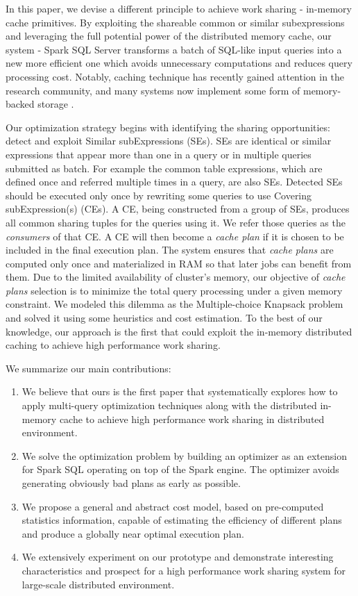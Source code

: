 In this paper, we devise a different principle to achieve work sharing - in-memory cache primitives. By exploiting the shareable common or similar subexpressions and leveraging the full potential power of the distributed memory cache, our system - Spark SQL Server transforms a batch of SQL-like input queries into a new more efficient one which avoids unnecessary computations and reduces query processing cost. Notably, caching technique has recently gained attention in the research community, and many systems now implement some form of memory-backed storage \cite{tachyon, hdfs}.

Our optimization strategy begins with identifying the sharing opportunities: detect and exploit Similar subExpressions (SEs). SEs are identical or similar expressions that appear more than one in a query or in multiple queries submitted as batch. For example the common table expressions, which are defined once and referred multiple times in a query, are also SEs. Detected SEs should be executed only once by rewriting some queries to use Covering subExpression(s) (CEs). A CE, being constructed from a group of SEs, produces all common sharing tuples for the queries using it. We refer those queries as the \emph{consumers} of that CE. A CE will then become a \emph{cache plan} if it is chosen to be included in the final execution plan. The system ensures that \emph{cache plans} are computed only once and materialized in RAM so that later jobs can benefit from them. Due to the limited availability of cluster's memory, our objective of \emph{cache plans} selection is to minimize the total query processing under a given memory constraint. We modeled this dilemma as the Multiple-choice Knapsack problem and solved it using some heuristics and cost estimation. To the best of our knowledge, our approach is the first that could exploit the in-memory distributed caching to achieve high performance work sharing.

We summarize our main contributions:
\begin{enumerate}
	\item We believe that ours is the first paper that systematically explores how to apply multi-query optimization techniques along with the distributed in-memory cache to achieve high performance work sharing in distributed environment.
	\item We solve the optimization problem by building an optimizer as an extension for Spark SQL operating on top of the Spark engine. The optimizer avoids generating obviously bad plans as early as possible.
	\item We propose a general and abstract cost model, based on pre-computed statistics information, capable of estimating the efficiency of different plans and produce a globally near optimal execution plan.
	\item We extensively experiment on our prototype and demonstrate interesting characteristics and prospect for a high performance work sharing system for large-scale distributed environment.
\end{enumerate}

